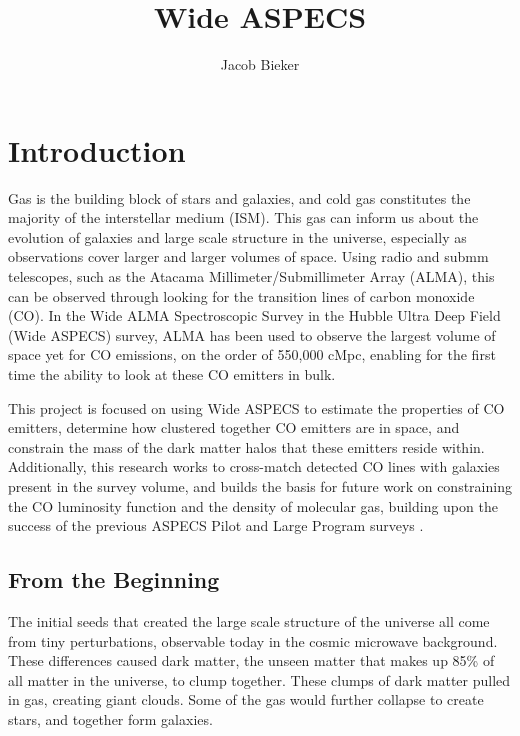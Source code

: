\documentclass[twoside,single]{lion-msc}
\title{Wide ASPECS}
\author{Jacob Bieker}
\affiliation{Leiden Observatory, Leiden University}
\begin{document}
\maketitle

\setcounter{page}{2}
\tableofcontents
\cleardoublepage

\setcounter{page}{1}
\chapter{Introduction}

Gas is the building block of stars and galaxies, and cold gas constitutes the majority of the interstellar medium (ISM). This gas can inform us about the evolution of galaxies and large scale structure in the universe, especially as observations cover larger and larger volumes of space. Using radio and submm telescopes, such as the Atacama Millimeter/Submillimeter Array (ALMA), this can be observed through looking for the transition lines of carbon monoxide (CO). In the Wide ALMA Spectroscopic Survey in the Hubble Ultra Deep Field (Wide ASPECS) survey, ALMA has been used to observe the largest volume of space yet for CO emissions, on the order of 550,000 cMpc, enabling for the first time the ability to look at these CO emitters in bulk.

This project is focused on using Wide ASPECS to estimate the properties of CO emitters, determine how clustered together CO emitters are in space, and constrain the mass of the dark matter halos that these emitters reside within. Additionally, this research works to cross-match detected CO lines with galaxies present in the survey volume, and builds the basis for future work on constraining the CO luminosity function and the density of molecular gas, building upon the success of the previous ASPECS Pilot and Large Program surveys \cite{walter2016alma, decarli2019alma}. 

\section{From the Beginning}

The initial seeds that created the large scale structure of the universe all come from tiny perturbations, observable today in the cosmic microwave background. These differences caused dark matter, the unseen matter that makes up 85\% of all matter in the universe, to clump together. These clumps of dark matter pulled in gas, creating giant clouds. Some of the gas would further collapse to create stars, and together form galaxies.
\end{document}
